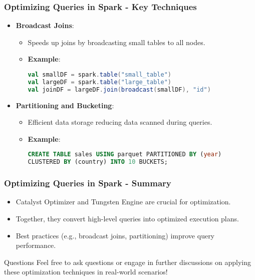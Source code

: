 \documentclass[aspectratio=169]{beamer}
\begin{document}
\begin{frame}[fragile]
    \frametitle{Optimizing Queries in Spark - Key Techniques}
    \begin{itemize}
        \item \textbf{Broadcast Joins}:
        \begin{itemize}
            \item Speeds up joins by broadcasting small tables to all nodes.
            \item \textbf{Example}:
            \begin{lstlisting}[language=Scala]
val smallDF = spark.table("small_table")
val largeDF = spark.table("large_table")
val joinDF = largeDF.join(broadcast(smallDF), "id")
            \end{lstlisting}
        \end{itemize}
        \item \textbf{Partitioning and Bucketing}:
        \begin{itemize}
            \item Efficient data storage reducing data scanned during queries.
            \item \textbf{Example}:
            \begin{lstlisting}[language=SQL]
CREATE TABLE sales USING parquet PARTITIONED BY (year) 
CLUSTERED BY (country) INTO 10 BUCKETS;
            \end{lstlisting}
        \end{itemize}
    \end{itemize}
\end{frame}

\begin{frame}
    \frametitle{Optimizing Queries in Spark - Summary}
    \begin{itemize}
        \item Catalyst Optimizer and Tungsten Engine are crucial for optimization.
        \item Together, they convert high-level queries into optimized execution plans.
        \item Best practices (e.g., broadcast joins, partitioning) improve query performance.
    \end{itemize}
    \vspace{0.5cm}
    \begin{block}{Questions}
        Feel free to ask questions or engage in further discussions on applying these optimization techniques in real-world scenarios!
    \end{block}
\end{frame}
\end{document}

